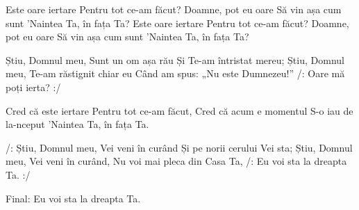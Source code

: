 \beginverse
Este oare iertare
Pentru tot ce-am făcut?
Doamne, pot eu oare
Să vin așa cum sunt
'Naintea Ta, în fața Ta?
Este oare iertare
Pentru tot ce-am făcut?
Doamne, pot eu oare
Să vin așa cum sunt
'Naintea Ta, în fața Ta?
\endverse

\beginchorus
Știu, Domnul meu,
Sunt un om așa rău
Și Te-am întristat mereu;
Știu, Domnul meu,
Te-am răstignit chiar eu
Când am spus: „Nu este Dumnezeu!”
/: Oare mă poți ierta? :/
\endchorus

\beginverse
Cred că este iertare
Pentru tot ce-am făcut,
Cred că acum e momentul
S-o iau de la-nceput
'Naintea Ta, în fața Ta.
\endverse

\beginchorus
/: Știu, Domnul meu,
Vei veni în curând
Și pe norii cerului Vei sta;
Știu, Domnul meu, Vei veni în curând,
Nu voi mai pleca din Casa Ta,
/: Eu voi sta la dreapta Ta. :/
\endchorus

\beginverse*
Final: Eu voi sta la dreapta Ta.
\endverse
\endsong